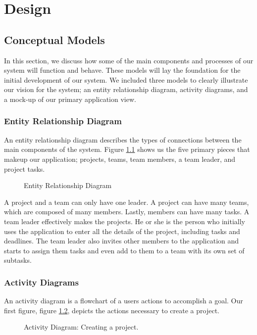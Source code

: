 \chapter{Design}

\section{Conceptual Models}
In this section, we discuss how some of the main components and processes of our system will function and behave. These models will lay the foundation for the initial development of our system. We included three models to clearly illustrate our vision for the system; an entity relationship diagram, activity diagrams, and a mock-up of our primary application view.
\subsection{Entity Relationship Diagram}
An entity relationship diagram describes the types of connections between the main components of the system. Figure \ref{erd} shows us the five primary pieces that makeup our application; projects, teams, team members, a team leader, and project tasks. 

\FloatBarrier
\begin{figure}[ht]
\centering
{}
\caption{Entity Relationship Diagram}
\label{erd}
\end{figure}
\FloatBarrier

\par A project and a team can only have one leader. A project can have many teams, which are composed of many members. Lastly, members can have many tasks. 
A team leader effectively makes the projects. He or she is the person who initially uses the application to enter all the details of the project, including tasks and deadlines. The team leader also invites other members to the application and starts to assign them tasks and even add to them to a team with its own set of subtasks. 

\subsection{Activity Diagrams}
An activity diagram is a flowchart of a user\textsc{}s actions to accomplish a goal. Our first figure, figure \ref{activityOne}, depicts the actions necessary to create a project. 

\FloatBarrier
\begin{figure}[ht]
\centering
{}
\caption{Activity Diagram: Creating a project.}
\label{activityOne}
\end{figure}
\FloatBarrier

